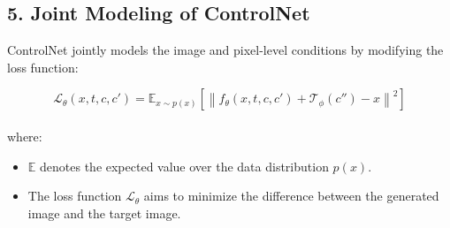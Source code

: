 \documentclass[12pt]{article}
\begin{document}
\subsection*{5. Joint Modeling of ControlNet}

ControlNet jointly models the image and pixel-level conditions by modifying the loss function:

\[
\mathcal{L}_\theta(x, t, c, c') = \mathbb{E}_{x \sim p(x)} \left[ \left\| f_\theta(x, t, c, c') + \mathcal{T}_\phi(c'') - x \right\|^2 \right]
\]
\\
where:
\begin{itemize}
    \item $\mathbb{E}$ denotes the expected value over the data distribution $p(x)$.
    \item The loss function $\mathcal{L}_\theta$ aims to minimize the difference between the generated image and the target image.
\end{itemize}
\end{document}
